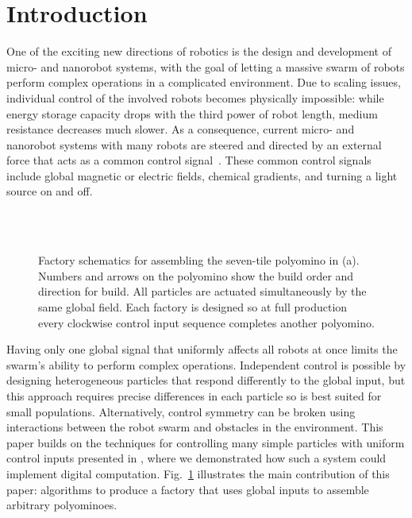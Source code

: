 \section{Introduction}\label{sec:Intro}

One of the exciting new directions of robotics is the design and development
of micro- and nanorobot systems, with the goal of letting a massive swarm of robots
perform complex operations in a complicated environment. Due to scaling 
issues, individual control of the involved robots becomes physically impossible:
while energy storage capacity drops with the third power of robot length,
medium resistance decreases much slower. As a consequence,
current micro- and nanorobot systems with many robots are steered and
directed by an external force that acts as a common control signal~\cite{Donald2013,Chiang2011,Hsi-Wen2012,Diller2013,Jing2013,Ou2013,Lanauze2013}.
These common control signals include global magnetic or electric fields,
chemical gradients, and turning a light source on and off. 

\begin{figure}
\centering
{}  \\ \vspace{-.8em}
 \\ \vspace{-.8em}      
\caption{\label{fig:factorySchematics}Factory schematics for assembling the seven-tile polyomino in (a).  Numbers and arrows on the polyomino show the build order and direction for build. All particles are actuated simultaneously by the same global field. Each factory is designed so at full production every clockwise control input sequence completes another polyomino.}
\end{figure}
 
Having only one global signal that uniformly affects all robots at once
limits the swarm's ability to perform complex operations.
Independent control is possible by designing heterogeneous particles that respond differently to the global input, but this approach requires precise differences in each particle so is best suited for small populations. Alternatively, control symmetry can be broken using interactions between the robot swarm
and obstacles in the environment. 
This paper builds on the techniques for controlling many simple particles with uniform control inputs presented in \cite{Becker2013f,Becker2014,Becker2014a}, where
we demonstrated how such a system could  implement digital computation.
Fig.~\ref{fig:factorySchematics} illustrates the main contribution of this paper: algorithms to produce a factory that uses global inputs to assemble arbitrary polyominoes.




